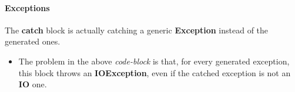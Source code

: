 
\paragraph{Exceptions}
\begin{itemize}
	\begin{itemize}
		The \textbf{catch} block
		is actually catching a generic \textbf{Exception} instead of the generated ones.
	\end{itemize}
	\checklist{53}
	\begin{itemize}
		\item The problem in the above \textit{code-block} is that, for every generated exception, this block throws an \textbf{IOException}, even if the catched exception is not an \textbf{IO} one.
	\end{itemize}
\end{itemize}


